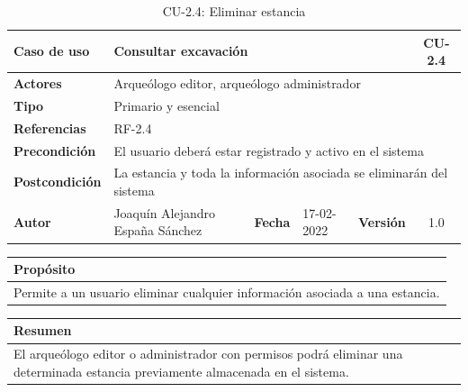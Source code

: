     \begin{table}[H]
    \begin{center}
        \begin{adjustbox}{width=\textwidth}
        \begin{tabular}{ | l | l | l | l | c | c | } 
            \hline
            \textbf{Caso de uso} & \multicolumn{4}{l|}{Consultar excavación} & \cellcolor{gray!50} \textbf{CU-2.4}\\
            \hline
            \textbf{Actores} & \multicolumn{5}{p{0.9\linewidth}|}{Arqueólogo editor, arqueólogo administrador} \\
            \hline
            \textbf{Tipo} & \multicolumn{5}{l|}{Primario y esencial} \\
            \hline
            \textbf{Referencias} & \multicolumn{3}{l|}{RF-2.4} & \multicolumn{2}{l|}{ }\\
            \hline
            \textbf{Precondición} & \multicolumn{5}{l|}{El usuario deberá estar registrado y activo en el sistema} \\
            \hline
            \textbf{Postcondición} & \multicolumn{5}{l|}{La estancia y toda la información asociada se eliminarán del sistema} \\
            \hline
            \textbf{Autor} & \multicolumn{1}{p{0.25\linewidth}|}{Joaquín Alejandro España Sánchez} & \textbf{Fecha} & 
            17-02-2022     & \textbf{Versión}                                                      & 1.0\\
            \hline
        \end{tabular}
        \end{adjustbox}
        \caption{CU-2.4: Eliminar estancia}
        \label{tab:delete-room}
    \end{center}
    \end{table}


    \begin{table}[H]
        \centering
        \begin{tabularx}{\textwidth}{@{} |L |@{}} \hline
            \textbf{Propósito} \\
            \hline
            Permite a un usuario eliminar cualquier información asociada a una estancia. \\
            \hline
        \end{tabularx}
    \end{table}

    \begin{table}[H]
        \centering
        \begin{tabularx}{\textwidth}{@{} |L |@{}} \hline
            \textbf{Resumen} \\
            \hline
            El arqueólogo editor o administrador con permisos podrá eliminar una determinada
            estancia previamente almacenada en el sistema. \\
            \hline
        \end{tabularx}
    \end{table}

